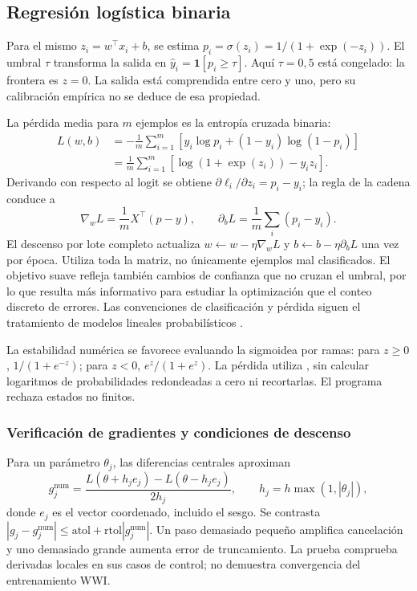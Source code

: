 \subsection{Regresión logística binaria}
Para el mismo $z_i=w^\top x_i+b$, se estima $p_i=\sigma(z_i)=1/(1+\exp(-z_i))$. El umbral $\tau$ transforma la salida en $\widehat y_i=\mathbf1[p_i\geq\tau]$. Aquí $\tau=0,5$ está congelado: la frontera es $z=0$. La salida está comprendida entre cero y uno, pero su calibración empírica no se deduce de esa propiedad.

La pérdida media para $m$ ejemplos es la entropía cruzada binaria:
\begin{align}
L(w,b)&=-\frac1m\sum_{i=1}^m[y_i\log p_i+(1-y_i)\log(1-p_i)]\label{eq:ce}\\
&=\frac1m\sum_{i=1}^m[\log(1+\exp(z_i))-y_i z_i].\nonumber
\end{align}
Derivando con respecto al logit se obtiene $\partial\ell_i/\partial z_i=p_i-y_i$; la regla de la cadena conduce a
\begin{equation}\nabla_wL=\frac1mX^\top(p-y),\qquad \partial_bL=\frac1m\sum_i(p_i-y_i).\label{eq:gradientes}\end{equation}
El descenso por lote completo actualiza $w\leftarrow w-\eta\nabla_wL$ y $b\leftarrow b-\eta\partial_bL$ una vez por época. Utiliza toda la matriz, no únicamente ejemplos mal clasificados. El objetivo suave refleja también cambios de confianza que no cruzan el umbral, por lo que resulta más informativo para estudiar la optimización que el conteo discreto de errores. Las convenciones de clasificación y pérdida siguen el tratamiento de modelos lineales probabilísticos \cite{bishop}.

La estabilidad numérica se favorece evaluando la sigmoidea por ramas: para $z\geq0$, $1/(1+e^{-z})$; para $z<0$, $e^z/(1+e^z)$. La pérdida utiliza , sin calcular logaritmos de probabilidades redondeadas a cero ni recortarlas. El programa rechaza estados no finitos.

\subsubsection{Verificación de gradientes y condiciones de descenso}
Para un parámetro $\theta_j$, las diferencias centrales aproximan
\begin{equation}g_j^{\mathrm{num}}=\frac{L(\theta+h_je_j)-L(\theta-h_je_j)}{2h_j},\qquad h_j=h\max(1,|\theta_j|),\end{equation}
donde $e_j$ es el vector coordenado, incluido el sesgo. Se contrasta $|g_j-g_j^{\mathrm{num}}|\leq\mathrm{atol}+\mathrm{rtol}|g_j^{\mathrm{num}}|$. Un paso demasiado pequeño amplifica cancelación y uno demasiado grande aumenta error de truncamiento. La prueba comprueba derivadas locales en sus casos de control; no demuestra convergencia del entrenamiento WWI.

